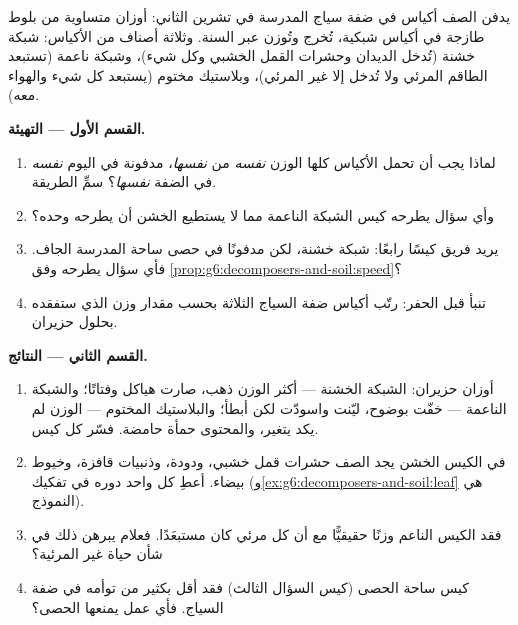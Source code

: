 \begin{problem}\label{pb:g6:decomposers-and-soil:1}
يدفن الصف أكياس  في ضفة سياج المدرسة في تشرين الثاني: أوزان
متساوية من  بلوط طازجة في أكياس شبكية، تُخرج وتُوزن عبر
السنة. وثلاثة أصناف من الأكياس: شبكة خشنة (تُدخل الديدان وحشرات
القمل الخشبي وكل شيء)، وشبكة ناعمة (تستبعد الطاقم المرئي ولا تُدخل
إلا غير المرئي)، وبلاستيك مختوم (يستبعد كل شيء والهواء معه).

\medskip\noindent\textbf{القسم الأول --- التهيئة.}
\begin{enumerate}
  \item لماذا يجب أن تحمل الأكياس كلها الوزن \emph{نفسه} من
         \emph{نفسها}، مدفونة في اليوم \emph{نفسه} في
        الضفة \emph{نفسها}؟ سمِّ الطريقة.
  \item وأي سؤال يطرحه كيس الشبكة الناعمة مما لا يستطيع الخشن أن
        يطرحه وحده؟
  \item يريد فريق كيسًا رابعًا: شبكة خشنة، لكن مدفونًا في حصى ساحة
        المدرسة الجاف. فأي سؤال يطرحه وفق
        \cref{prop:g6:decomposers-and-soil:speed}؟
  \item تنبأ قبل الحفر: رتّب أكياس ضفة السياج الثلاثة بحسب مقدار
        وزن  الذي ستفقده بحلول حزيران.
\end{enumerate}

\medskip\noindent\textbf{القسم الثاني --- النتائج.}
\begin{enumerate}[resume]
  \item أوزان حزيران: الشبكة الخشنة --- أكثر الوزن ذهب، 
        صارت هياكل وفتاتًا؛ والشبكة الناعمة --- خفّت بوضوح،
         ليّنت واسودّت لكن أبطأ؛ والبلاستيك المختوم ---
        الوزن لم يكد يتغير، والمحتوى حمأة حامضة. فسّر كل كيس.
  \item في الكيس الخشن يجد الصف حشرات قمل خشبي، ودودة، وذنبيات
        قافزة، وخيوط  بيضاء. أعطِ كل واحد دوره في تفكيك 
        (و\cref{ex:g6:decomposers-and-soil:leaf} هي النموذج).
  \item فقد الكيس الناعم وزنًا حقيقيًّا مع أن كل  مرئي كان
        مستبعَدًا. فعلام يبرهن ذلك في شأن حياة  غير المرئية؟
  \item كيس ساحة الحصى (كيس السؤال الثالث) فقد أقل بكثير من
        توأمه في ضفة السياج. فأي  عمل يمنعها الحصى؟
\end{enumerate}


\end{problem}
